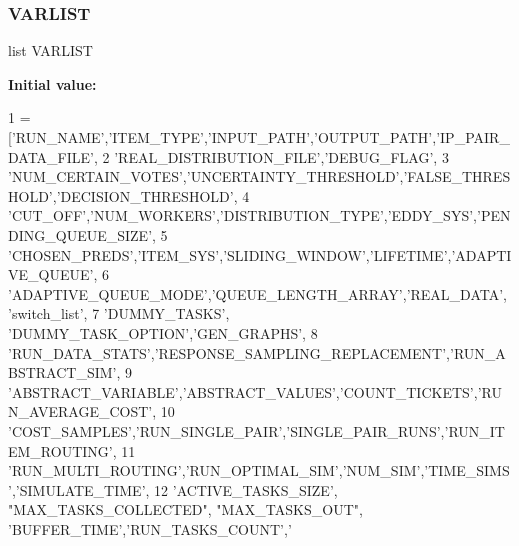 \subsubsection{\texorpdfstring{V\+A\+R\+L\+I\+ST}{VARLIST}}
{\footnotesize\ttfamily list V\+A\+R\+L\+I\+ST}

{\bfseries Initial value\+:}
\begin{DoxyCode}
1 =   [\textcolor{stringliteral}{'RUN\_NAME'},\textcolor{stringliteral}{'ITEM\_TYPE'},\textcolor{stringliteral}{'INPUT\_PATH'},\textcolor{stringliteral}{'OUTPUT\_PATH'},\textcolor{stringliteral}{'IP\_PAIR\_DATA\_FILE'},
2             \textcolor{stringliteral}{'REAL\_DISTRIBUTION\_FILE'},\textcolor{stringliteral}{'DEBUG\_FLAG'},
3             \textcolor{stringliteral}{'NUM\_CERTAIN\_VOTES'},\textcolor{stringliteral}{'UNCERTAINTY\_THRESHOLD'},\textcolor{stringliteral}{'FALSE\_THRESHOLD'},\textcolor{stringliteral}{'DECISION\_THRESHOLD'},
4             \textcolor{stringliteral}{'CUT\_OFF'},\textcolor{stringliteral}{'NUM\_WORKERS'},\textcolor{stringliteral}{'DISTRIBUTION\_TYPE'},\textcolor{stringliteral}{'EDDY\_SYS'},\textcolor{stringliteral}{'PENDING\_QUEUE\_SIZE'},
5             \textcolor{stringliteral}{'CHOSEN\_PREDS'},\textcolor{stringliteral}{'ITEM\_SYS'},\textcolor{stringliteral}{'SLIDING\_WINDOW'},\textcolor{stringliteral}{'LIFETIME'},\textcolor{stringliteral}{'ADAPTIVE\_QUEUE'},
6             \textcolor{stringliteral}{'ADAPTIVE\_QUEUE\_MODE'},\textcolor{stringliteral}{'QUEUE\_LENGTH\_ARRAY'},\textcolor{stringliteral}{'REAL\_DATA'}, \textcolor{stringliteral}{'switch\_list'},
7             \textcolor{stringliteral}{'DUMMY\_TASKS'}, \textcolor{stringliteral}{'DUMMY\_TASK\_OPTION'},\textcolor{stringliteral}{'GEN\_GRAPHS'},
8             \textcolor{stringliteral}{'RUN\_DATA\_STATS'},\textcolor{stringliteral}{'RESPONSE\_SAMPLING\_REPLACEMENT'},\textcolor{stringliteral}{'RUN\_ABSTRACT\_SIM'},
9             \textcolor{stringliteral}{'ABSTRACT\_VARIABLE'},\textcolor{stringliteral}{'ABSTRACT\_VALUES'},\textcolor{stringliteral}{'COUNT\_TICKETS'},\textcolor{stringliteral}{'RUN\_AVERAGE\_COST'},
10             \textcolor{stringliteral}{'COST\_SAMPLES'},\textcolor{stringliteral}{'RUN\_SINGLE\_PAIR'},\textcolor{stringliteral}{'SINGLE\_PAIR\_RUNS'},\textcolor{stringliteral}{'RUN\_ITEM\_ROUTING'},
11             \textcolor{stringliteral}{'RUN\_MULTI\_ROUTING'},\textcolor{stringliteral}{'RUN\_OPTIMAL\_SIM'},\textcolor{stringliteral}{'NUM\_SIM'},\textcolor{stringliteral}{'TIME\_SIMS'},\textcolor{stringliteral}{'SIMULATE\_TIME'},
12             \textcolor{stringliteral}{'ACTIVE\_TASKS\_SIZE'}, \textcolor{stringliteral}{"MAX\_TASKS\_COLLECTED"}, \textcolor{stringliteral}{"MAX\_TASKS\_OUT"}, \textcolor{stringliteral}{'BUFFER\_TIME'},\textcolor{stringliteral}{'RUN\_TASKS\_COUNT'},\textcolor{stringliteral}{'
}
\end{DoxyCode}
